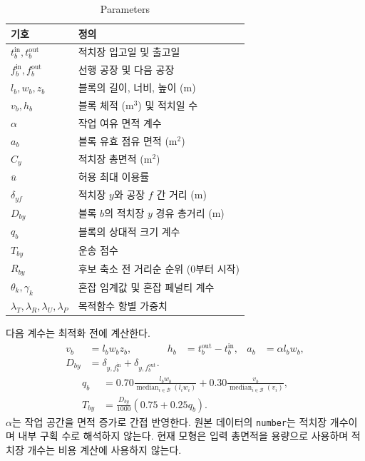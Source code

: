 \documentclass[a4paper,11pt]{article}
\begin{document}
\begin{table}[htbp]
\centering
\caption{Parameters}
\begin{tabularx}{\linewidth}{lX}
\toprule
기호 & 정의 \\
\midrule
$t_b^{\mathrm{in}},t_b^{\mathrm{out}}$ & 적치장 입고일 및 출고일 \\
$f_b^{\mathrm{in}},f_b^{\mathrm{out}}$ & 선행 공장 및 다음 공장 \\
$l_b,w_b,z_b$ & 블록의 길이, 너비, 높이 (m) \\
$v_b,h_b$ & 블록 체적 ($\mathrm m^3$) 및 적치일 수 \\
$\alpha$ & 작업 여유 면적 계수 \\
$a_b$ & 블록 유효 점유 면적 ($\mathrm m^2$) \\
$C_y$ & 적치장 총면적 ($\mathrm m^2$) \\
$\bar u$ & 허용 최대 이용률 \\
$\delta_{yf}$ & 적치장 $y$와 공장 $f$ 간 거리 (m) \\
$D_{by}$ & 블록 $b$의 적치장 $y$ 경유 총거리 (m) \\
$q_b$ & 블록의 상대적 크기 계수 \\
$T_{by}$ & 운송 점수 \\
$R_{by}$ & 후보 축소 전 거리순 순위 (0부터 시작) \\
$\theta_k,\gamma_k$ & 혼잡 임계값 및 혼잡 페널티 계수 \\
$\lambda_T,\lambda_R,\lambda_U,\lambda_P$ & 목적함수 항별 가중치 \\
\bottomrule
\end{tabularx}
\end{table}

다음 계수는 최적화 전에 계산한다.
\begin{align}
v_b&=l_bw_bz_b, & h_b&=t_b^{\mathrm{out}}-t_b^{\mathrm{in}}, & a_b&=\alpha l_bw_b,\\
D_{by}&=\delta_{y,f_b^{\mathrm{in}}}+\delta_{y,f_b^{\mathrm{out}}}.
\end{align}
\begin{align}
q_b&=0.70\frac{l_bw_b}{\operatorname{median}_{i\in\mathcal B}(l_iw_i)}
+0.30\frac{v_b}{\operatorname{median}_{i\in\mathcal B}(v_i)},\\
T_{by}&=\frac{D_{by}}{1000}(0.75+0.25q_b).
\end{align}
$\alpha$는 작업 공간을 면적 증가로 간접 반영한다.
원본 데이터의 \texttt{number}는 적치장 개수이며 내부 구획 수로 해석하지 않는다.
현재 모형은 입력 총면적을 용량으로 사용하며 적치장 개수는 비용 계산에 사용하지 않는다.
\end{document}
